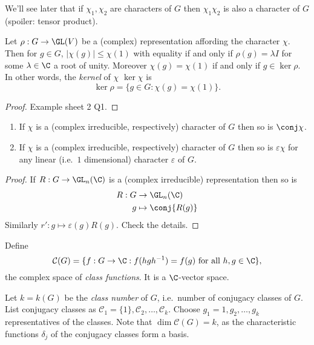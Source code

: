 \documentclass[a4paper]{article}
\theoremstyle{definition}
\begin{document}
\begin{remark}
  We'll see later that if \(\chi_1, \chi_2\) are characters of \(G\) then \(\chi_1\chi_2\) is also a character of \(G\) (spoiler: tensor product).
\end{remark}

\begin{lemma}
  \label{lemma:kernel of character}
  Let \(\rho: G \to \GL(V)\) be a (complex) representation affording the character \(\chi\). Then for \(g \in G\), \(|\chi(g)| \leq \chi(1)\) with equality if and only if \(\rho(g) = \lambda I\) for some \(\lambda \in \C\) a root of unity. Moreover \(\chi(g) = \chi(1)\) if and only if \(g \in \ker \rho\). In other words, the \emph{kernel} of \(\chi\) \(\ker \chi\) is
  \[
    \ker \rho = \{g \in G: \chi(g) = \chi(1)\}.
  \]
\end{lemma}

\begin{proof}
  Example sheet 2 Q1.
\end{proof}

\begin{lemma}\leavevmode
  \begin{enumerate}
  \item If \(\chi\) is a (complex irreducible, respectively) character of \(G\) then so is \(\conj \chi\).
  \item If \(\chi\) is a (complex irreducible, respectively) character of \(G\) then so is \(\varepsilon \chi\) for any linear (i.e.\ \(1\) dimensional) character \(\varepsilon\) of \(G\).
  \end{enumerate}
\end{lemma}

\begin{proof}
  If \(R: G \to \GL_n(\C)\) is a (complex irreducible) representation then so is
  \begin{align*}
    R: G &\to \GL_n(\C) \\
    g &\mapsto \conj{R(g)}
  \end{align*}
  Similarly \(r': g \mapsto \varepsilon(g) R(g)\). Check the details.
\end{proof}

\begin{definition}
  Define
  \[
    \mathcal C(G) = \{f: G \to \C: f(hgh^{-1}) = f(g) \text{ for all } h, g \in \C\},
  \]
  the complex space of \emph{class functions}. It is a \(\C\)-vector space.

  Let \(k = k(G)\) be the \emph{class number} of \(G\), i.e.\ number of conjugacy classes of \(G\). List conjugacy classes as \(\mathcal C_1 = \{1\}, \mathcal C_2, \dots, \mathcal C_k\). Choose \(g_1 = 1, g_2, \dots, g_k\) representatives of the classes. Note that \(\dim \mathcal C(G) = k\), as the characteristic functions \(\delta_j\) of the conjugacy classes form a basis.
\end{definition}
\end{document}
